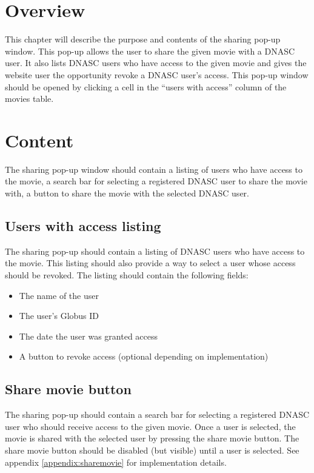 
\section{Overview}

This chapter will describe the purpose and contents of the sharing pop-up window. This 
pop-up allows the user to share the given movie with a DNASC user. It also lists 
DNASC users who have access to the given movie and gives the website user the opportunity 
revoke a DNASC user's access. This pop-up window should be opened by clicking a cell in 
the ``users with access'' column of the movies table.

\section{Content}

The sharing pop-up window should contain a listing of users who have access to the movie,
a search bar for selecting a registered DNASC user to share the movie with, a button to 
share the movie with the selected DNASC user.

\subsection{Users with access listing}

The sharing pop-up should contain a listing of DNASC users who have access to the movie.
This listing should also provide a way to select a user whose access should be revoked. 
The listing should contain the following fields:

\begin{itemize}\itemsep1pt
    \item The name of the user
    \item The user's Globus ID
    \item The date the user was granted access
    \item A button to revoke access (optional depending on implementation)
\end{itemize}

\subsection{Share movie button}

The sharing pop-up should contain a search bar for selecting a registered DNASC user 
who should receive access to the given movie. Once a user is selected, the movie is
shared with the selected user by pressing the share movie button. The share movie button 
should be disabled (but visible) until a user is selected. See appendix 
\ref{appendix:sharemovie} for implementation details.